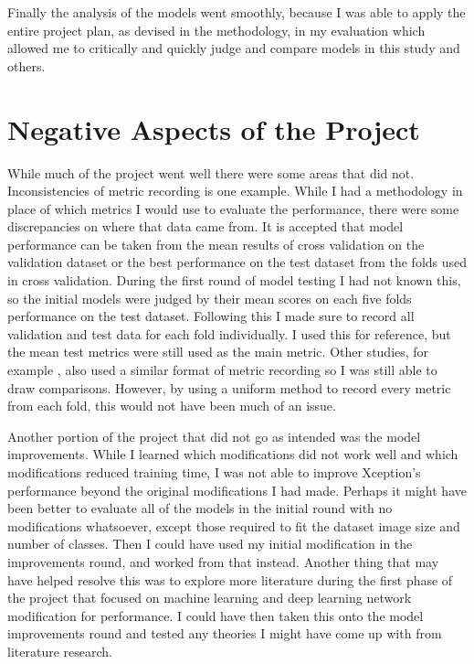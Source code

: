 Finally the analysis of the models went smoothly, because I was able to apply the entire project plan, as devised in the methodology, in my evaluation which allowed me to critically and quickly judge and compare models in this study and others.

\section{Negative Aspects of the Project}
While much of the project went well there were some areas that did not. Inconsistencies of metric recording is one example. While I had a methodology in place of which metrics I would use to evaluate the performance, there were some discrepancies on where that data came from. It is accepted that model performance can be taken from the mean results of cross validation on the validation dataset or the best performance on the test dataset from the folds used in cross validation. During the first round of model testing I had not known this, so the initial models were judged by their mean scores on each five folds performance on the test dataset. Following this I made sure to record all validation and test data for each fold individually. I used this for reference, but the mean test metrics were still used as the main metric. Other studies, for example \cite{bressem2020comparing}, also used a similar format of metric recording so I was still able to draw comparisons. However, by using a uniform method to record every metric from each fold, this would not have been much of an issue.

Another portion of the project that did not go as intended was the model improvements. While I learned which modifications did not work well and which modifications reduced training time, I was not able to improve Xception's performance beyond the original modifications I had made. Perhaps it might have been better to evaluate all of the models in the initial round with no modifications whatsoever, except those required to fit the dataset image size and number of classes. Then I could have used my initial modification in the improvements round, and worked from that instead. Another thing that may have helped resolve this was to explore more literature during the first phase of the project that focused on machine learning and deep learning network modification for performance. I could have then taken this onto the model improvements round and tested any theories I might have come up with from literature research.


